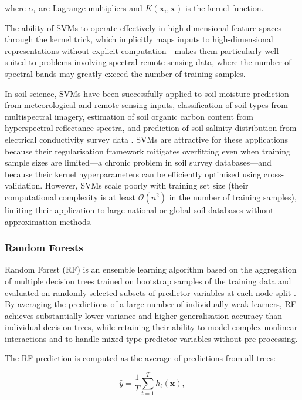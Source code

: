 \documentclass[land,article,submit,pdftex,moreauthors]{Definitions/mdpi}
\numberwithin{equation}{section}
\begin{document}
where $\alpha_i$ are Lagrange multipliers and $K(\mathbf{x}_i,\mathbf{x})$ is the kernel function.

The ability of SVMs to operate effectively in high-dimensional feature spaces---through the kernel trick, which implicitly maps inputs to high-dimensional representations without explicit computation---makes them particularly well-suited to problems involving spectral remote sensing data, where the number of spectral bands may greatly exceed the number of training samples.

In soil science, SVMs have been successfully applied to soil moisture prediction from meteorological and remote sensing inputs, classification of soil types from multispectral imagery, estimation of soil organic carbon content from hyperspectral reflectance spectra, and prediction of soil salinity distribution from electrical conductivity survey data \citep{viscarra2010predictive, Lemenkova202411}. SVMs are attractive for these applications because their regularisation framework mitigates overfitting even when training sample sizes are limited---a chronic problem in soil survey databases---and because their kernel hyperparameters can be efficiently optimised using cross-validation. However, SVMs scale poorly with training set size (their computational complexity is at least $\mathcal{O}(n^2)$ in the number of training samples), limiting their application to large national or global soil databases without approximation methods.

\subsubsection{Random Forests}

Random Forest (RF) is an ensemble learning algorithm based on the aggregation of multiple decision trees trained on bootstrap samples of the training data and evaluated on randomly selected subsets of predictor variables at each node split \citep{breiman2001random}. By averaging the predictions of a large number of individually weak learners, RF achieves substantially lower variance and higher generalisation accuracy than individual decision trees, while retaining their ability to model complex nonlinear interactions and to handle mixed-type predictor variables without pre-processing.

The RF prediction is computed as the average of predictions from all trees:

\begin{equation}
\hat{y}=\frac{1}{T}\sum_{t=1}^{T} h_t(\mathbf{x}),
\end{equation}
\end{document}

